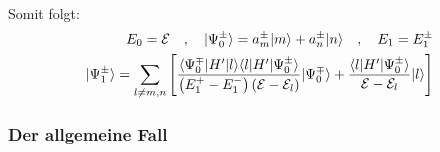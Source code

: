Somit folgt:
\begin{align*}
    E_0 = \mathcal{E}
    \hspace{10pt} , \hspace{10pt}
    |\Psi_0^\pm \rangle = a_m^\pm |m\rangle + a_n^\pm |n\rangle
    \hspace{10pt} , \hspace{10pt}
    E_1 = E_1^\pm
    \\
    |\Psi_1^\pm \rangle = \sum_{l \neq m,n} \left[ 
        \frac{\langle \Psi_0^\mp | H' | l \rangle \langle l | H' | \Psi_0^\pm \rangle}{\left( E_1^+ - E_1^- \right) \left( \mathcal{E} - \mathcal{E}_l \right)} | \Psi_0^\mp \rangle
        + \frac{\langle l | H' | \Psi_0^\pm \rangle}{\mathcal{E} - \mathcal{E}_l} |l\rangle
     \right]
\end{align*}

\subsubsection{Der allgemeine Fall}

